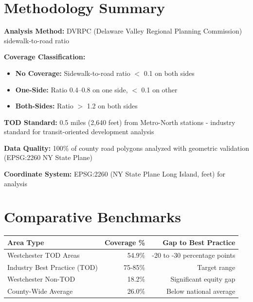 \documentclass[11pt,letterpaper]{article}
\begin{document}
\vspace{1em}

\section{Methodology Summary}

\textbf{Analysis Method:} DVRPC (Delaware Valley Regional Planning Commission) sidewalk-to-road ratio

\textbf{Coverage Classification:}
\begin{itemize}[leftmargin=*]
    \item \textbf{No Coverage:} Sidewalk-to-road ratio $<$ 0.1 on both sides
    \item \textbf{One-Side:} Ratio 0.4--0.8 on one side, $<$ 0.1 on other
    \item \textbf{Both-Sides:} Ratio $>$ 1.2 on both sides
\end{itemize}

\textbf{TOD Standard:} 0.5 miles (2,640 feet) from Metro-North stations - industry standard for transit-oriented development analysis

\textbf{Data Quality:} 100\% of county road polygons analyzed with geometric validation (EPSG:2260 NY State Plane)

\textbf{Coordinate System:} EPSG:2260 (NY State Plane Long Island, feet) for analysis

\vspace{1em}

\section{Comparative Benchmarks}

\begin{table}[h]
\centering
\begin{tabular}{@{}lrr@{}}
\toprule
\textbf{Area Type} & \textbf{Coverage \%} & \textbf{Gap to Best Practice} \\
\midrule
Westchester TOD Areas & 54.9\% & -20 to -30 percentage points \\
Industry Best Practice (TOD) & 75-85\% & Target range \\
Westchester Non-TOD & 18.2\% & Significant equity gap \\
County-Wide Average & 26.0\% & Below national average \\
\bottomrule
\end{tabular}
\end{table}
\end{document}
